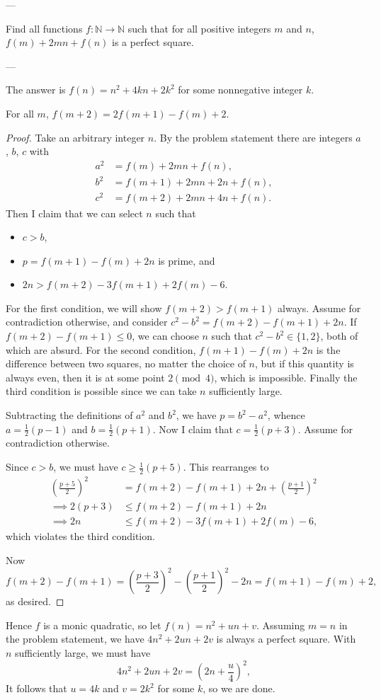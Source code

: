 
---

Find all functions $f:\mathbb N\to\mathbb N$ such that for all positive integers $m$ and $n$, $f(m)+2mn+f(n)$ is a perfect square.

---

The answer is $f(n)=n^2+4kn+2k^2$ for some nonnegative integer $k$.
\begin{iclaim*}
    For all $m$, $f(m+2)=2f(m+1)-f(m)+2$.
\end{iclaim*}
\begin{proof}
    Take an arbitrary integer $n$. By the problem statement there are integers $a$, $b$, $c$ with
    \begin{align*}
        a^2&=f(m)+2mn+f(n),\\
        b^2&=f(m+1)+2mn+2n+f(n),\\
        c^2&=f(m+2)+2mn+4n+f(n).
    \end{align*}
    Then I claim that we can select $n$ such that
    \begin{itemize}[itemsep=0em]
        \item $c>b$,
        \item $p=f(m+1)-f(m)+2n$ is prime, and
        \item $2n>f(m+2)-3f(m+1)+2f(m)-6$.
    \end{itemize}
    For the first condition, we will show $f(m+2)>f(m+1)$ always. Assume for contradiction otherwise, and consider $c^2-b^2=f(m+2)-f(m+1)+2n$. If $f(m+2)-f(m+1)\le0$, we can choose $n$ such that $c^2-b^2\in\{1,2\}$, both of which are absurd. For the second condition, $f(m+1)-f(m)+2n$ is the difference between two squares, no matter the choice of $n$, but if this quantity is always even, then it is at some point $2\pmod4$, which is impossible. Finally the third condition is possible since we can take $n$ sufficiently large.

    Subtracting the definitions of $a^2$ and $b^2$, we have $p=b^2-a^2$, whence $a=\tfrac12(p-1)$ and $b=\tfrac12(p+1)$. Now I claim that $c=\tfrac12(p+3)$. Assume for contradiction otherwise.

    Since $c>b$, we must have $c\ge\tfrac12(p+5)$. This rearranges to
    \begin{align*}
        \left(\frac{p+5}2\right)^2&=f(m+2)-f(m+1)+2n+\left(\frac{p+1}2\right)^2\\
        \implies2(p+3)&\le f(m+2)-f(m+1)+2n\\
        \implies 2n&\le f(m+2)-3f(m+1)+2f(m)-6,
    \end{align*}
    which violates the third condition.

    Now \[f(m+2)-f(m+1)=\left(\frac{p+3}2\right)^2-\left(\frac{p+1}2\right)^2-2n=f(m+1)-f(m)+2,\]
    as desired.
\end{proof}

Hence $f$ is a monic quadratic, so let $f(n)=n^2+un+v$. Assuming $m=n$ in the problem statement, we have $4n^2+2un+2v$ is always a perfect square. With $n$ sufficiently large, we must have \[4n^2+2un+2v=\left(2n+\frac u4\right)^2,\]
It follows that $u=4k$ and $v=2k^2$ for some $k$, so we are done.

